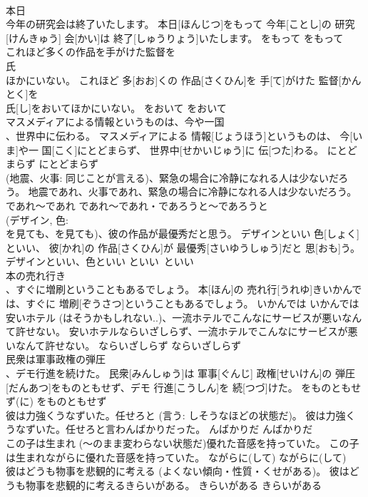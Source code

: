 \documentclass[8pt]{extreport}
\begin{document}
\begin{CJK}{UTF8}{min}
\\	本日 
\\	今年の研究会は終了いたします。	本日[ほんじつ]をもって 今年[ことし]の 研究[けんきゅう] 会[かい]は 終了[しゅうりょう]いたします。	をもって	をもって	
\\	これほど多くの作品を手がけた監督を
\\	氏 
\\	ほかにいない。	これほど 多[おお]くの 作品[さくひん]を 手[て]がけた 監督[かんとく]を 
\\	氏[し]をおいてほかにいない。	をおいて	をおいて	
\\	マスメディアによる情報というものは、今や一国 
\\	、世界中に伝わる。	マスメディアによる 情報[じょうほう]というものは、 今[いま]や一 国[こく]にとどまらず、 世界中[せかいじゅう]に 伝[つた]わる。	にとどまらず	にとどまらず	
\\	(地震、火事: 同じことが言える)、緊急の場合に冷静になれる人は少ないだろう。	地震であれ、火事であれ、緊急の場合に冷静になれる人は少ないだろう。	であれ～であれ	であれ～であれ・であろうと～であろうと	
\\	(デザイン, 色: 
\\	を見ても、を見ても)、彼の作品が最優秀だと思う。	デザインといい 色[しょく]といい、 彼[かれ]の 作品[さくひん]が 最優秀[さいゆうしゅう]だと 思[おも]う。	デザインといい、色といい	といい~といい	
\\	本の売れ行き 
\\	、すぐに増刷ということもあるでしょう。	本[ほん]の 売れ行[うれゆ]きいかんでは、すぐに 増刷[ぞうさつ]ということもあるでしょう。	いかんでは	いかんでは	
\\	安いホテル (はそうかもしれない..)、一流ホテルでこんなにサービスが悪いなんて許せない。	安いホテルならいざしらず、一流ホテルでこんなにサービスが悪いなんて許せない。	ならいざしらず	ならいざしらず	
\\	民衆は軍事政権の弾圧 
\\	、デモ行進を続けた。	民衆[みんしゅう]は 軍事[ぐんじ] 政権[せいけん]の 弾圧[だんあつ]をものともせず、デモ 行進[こうしん]を 続[つづ]けた。	をものともせず(に)	をものともせず	
\\	彼は力強くうなずいた。任せろと (言う: しそうなほどの状態だ)。	彼は力強くうなずいた。任せろと言わんばかりだった。	んばかりだ	んばかりだ	
\\	この子は生まれ (～のまま変わらない状態だ)優れた音感を持っていた。	この子は生まれながらに優れた音感を持っていた。	ながらに(して)	ながらに(して)	
\\	彼はどうも物事を悲観的に考える (よくない傾向・性質・くせがある)。	彼はどうも物事を悲観的に考えるきらいがある。	きらいがある	きらいがある	

\end{CJK}
\end{document}
